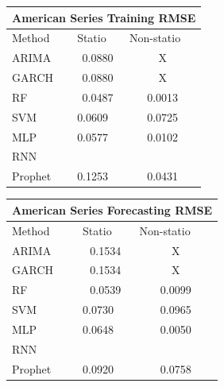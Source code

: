 \documentclass[10pt,twocolumn,letterpaper]{article}
\begin{document}
\begin{table}[h]\label{table:trainingRMSE}
	\centering
	\begin{tabular}{|lll|}
		\hline
		\multicolumn{3}{|c|}{American Series Training RMSE}                                                  \\ \hline
		\multicolumn{1}{|l|}{Method}  & \multicolumn{1}{l|}{Statio} & Non-statio             \\ \hline
		\multicolumn{1}{|l|}{ARIMA}   & \multicolumn{1}{c|}{0.0880}       & \multicolumn{1}{c|}{X} \\ \hline
		\multicolumn{1}{|l|}{GARCH}   & \multicolumn{1}{c|}{0.0880}       & \multicolumn{1}{c|}{X} \\ \hline
		\multicolumn{1}{|l|}{RF}      & \multicolumn{1}{c|}{0.0487}       & \multicolumn{1}{c|}{0.0013}  \\ \hline
		\multicolumn{1}{|l|}{SVM}     & \multicolumn{1}{l|}{0.0609}       & \multicolumn{1}{c|}{0.0725}  \\ \hline
		\multicolumn{1}{|l|}{MLP}     & \multicolumn{1}{l|}{0.0577}       & \multicolumn{1}{c|}{0.0102}  \\ \hline
		\multicolumn{1}{|l|}{RNN}     & \multicolumn{1}{l|}{}       & \multicolumn{1}{c|}{}  \\ \hline
		\multicolumn{1}{|l|}{Prophet} & \multicolumn{1}{l|}{0.1253}       & \multicolumn{1}{c|}{0.0431}  \\ \hline
	\end{tabular}
\end{table}

\begin{table}[h]
	\label{table:forecastRMSE}
	\centering
	\begin{tabular}{|lll|}
		\hline
		\multicolumn{3}{|c|}{American Series Forecasting RMSE}                                                  \\ \hline
		\multicolumn{1}{|l|}{Method}  & \multicolumn{1}{l|}{Statio} & Non-statio             \\ \hline
		\multicolumn{1}{|l|}{ARIMA}   & \multicolumn{1}{c|}{0.1534}       & \multicolumn{1}{c|}{X} \\ \hline
		\multicolumn{1}{|l|}{GARCH}   & \multicolumn{1}{c|}{0.1534}       & \multicolumn{1}{c|}{X} \\ \hline
		\multicolumn{1}{|l|}{RF}      & \multicolumn{1}{c|}{0.0539}       & \multicolumn{1}{c|}{0.0099}  \\ \hline
		\multicolumn{1}{|l|}{SVM}     & \multicolumn{1}{l|}{0.0730}       & \multicolumn{1}{c|}{0.0965}  \\ \hline
		\multicolumn{1}{|l|}{MLP}     & \multicolumn{1}{l|}{0.0648}       & \multicolumn{1}{c|}{0.0050}  \\ \hline
		\multicolumn{1}{|l|}{RNN}     & \multicolumn{1}{l|}{}       & \multicolumn{1}{c|}{}  \\ \hline
		\multicolumn{1}{|l|}{Prophet} & \multicolumn{1}{l|}{0.0920}       & \multicolumn{1}{c|}{0.0758}  \\ \hline
	\end{tabular}
\end{table}
\end{document}
